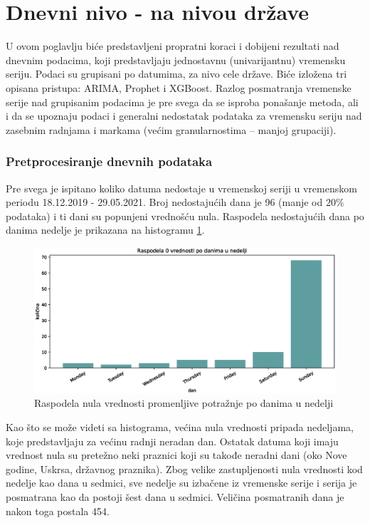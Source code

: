 \documentclass[12pt,oneside]{memoir}
\begin{document}
\section{Dnevni nivo - na nivou države} 
U ovom poglavlju biće predstavljeni propratni koraci i dobijeni rezultati nad dnevnim podacima, koji predstavljaju jednostavnu (univarijantnu) vremensku seriju. Podaci su grupisani po datumima, za nivo cele države. Biće izložena tri opisana pristupa: ARIMA, Prophet i XGBoost. Razlog posmatranja vremenske serije nad grupisanim podacima je pre svega da se isproba ponašanje metoda, ali i da se upoznaju podaci i generalni nedostatak podataka za vremensku seriju nad zasebnim radnjama i markama (većim granularnostima -- manjoj grupaciji).

\subsubsection{Pretprocesiranje dnevnih podataka}
Pre svega je ispitano koliko datuma nedostaje u vremenskoj seriji u vremenskom periodu 18.12.2019 - 29.05.2021. Broj nedostajućih dana je 96 (manje od $20\%$ podataka) i ti dani su popunjeni vrednošću nula. Raspodela nedostajućih dana po danima nedelje je prikazana na histogramu \ref{fig: dani_nedelje}. 
\begin{figure}[!ht]
  \centering
  \includegraphics[width=1\textwidth]{./grafici/nule_po_danima_nedelje.eps}
  \caption{Raspodela nula vrednosti promenljive potražnje po danima u nedelji}
  \label{fig: dani_nedelje}
\end{figure}
Kao što se može videti sa histograma, većina nula vrednosti pripada nedeljama, koje predstavljaju za većinu radnji neradan dan. Ostatak datuma koji imaju vrednost nula su pretežno neki praznici koji su takođe neradni dani (oko Nove godine, Uskrsa, državnog praznika). Zbog velike zastupljenosti nula vrednosti kod nedelje kao dana u sedmici, sve nedelje su izbačene iz vremenske serije i serija je posmatrana kao da postoji šest dana u sedmici. Veličina posmatranih dana je nakon toga postala 454.
\end{document}
